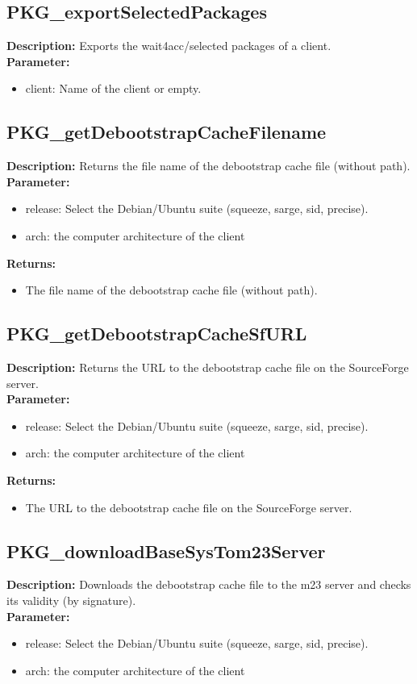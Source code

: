 \subsection{PKG\_exportSelectedPackages}
\textbf{Description:} Exports the wait4acc/selected packages of a client.\\
\textbf{Parameter:}
\begin{itemize}
\item client: Name of the client or empty.
\end{itemize}

\subsection{PKG\_getDebootstrapCacheFilename}
\textbf{Description:} Returns the file name of the debootstrap cache file (without path).\\
\textbf{Parameter:}
\begin{itemize}
\item release: Select the Debian/Ubuntu suite (squeeze, sarge, sid, precise).
\item arch: the computer architecture of the client
\end{itemize}
\textbf{Returns:}
\begin{itemize}
\item The file name of the debootstrap cache file (without path).
\end{itemize}

\subsection{PKG\_getDebootstrapCacheSfURL}
\textbf{Description:} Returns the URL to the debootstrap cache file on the SourceForge server.\\
\textbf{Parameter:}
\begin{itemize}
\item release: Select the Debian/Ubuntu suite (squeeze, sarge, sid, precise).
\item arch: the computer architecture of the client
\end{itemize}
\textbf{Returns:}
\begin{itemize}
\item The URL to the debootstrap cache file on the SourceForge server.
\end{itemize}

\subsection{PKG\_downloadBaseSysTom23Server}
\textbf{Description:} Downloads the debootstrap cache file to the m23 server and checks its validity (by signature).\\
\textbf{Parameter:}
\begin{itemize}
\item release: Select the Debian/Ubuntu suite (squeeze, sarge, sid, precise).
\item arch: the computer architecture of the client
\end{itemize}


